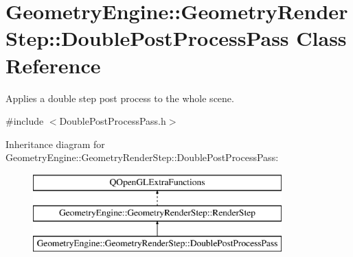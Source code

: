 \hypertarget{class_geometry_engine_1_1_geometry_render_step_1_1_double_post_process_pass}{}\section{Geometry\+Engine\+::Geometry\+Render\+Step\+::Double\+Post\+Process\+Pass Class Reference}
\label{class_geometry_engine_1_1_geometry_render_step_1_1_double_post_process_pass}


Applies a double step post process to the whole scene.  




{\ttfamily \#include $<$Double\+Post\+Process\+Pass.\+h$>$}

Inheritance diagram for Geometry\+Engine\+::Geometry\+Render\+Step\+::Double\+Post\+Process\+Pass\+:\begin{figure}[H]
\begin{center}
\leavevmode
\includegraphics[height=3.000000cm]{class_geometry_engine_1_1_geometry_render_step_1_1_double_post_process_pass}
\end{center}
\end{figure}
